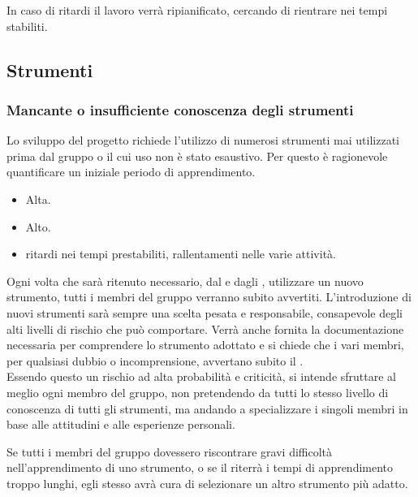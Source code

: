 \documentclass[a4paper, titlepage]{article}
\begin{document}
 In caso di ritardi il lavoro verrà ripianificato, cercando di rientrare nei tempi stabiliti.

\subsection{Strumenti}
\subsubsection{Mancante o insufficiente conoscenza degli strumenti}
 Lo sviluppo del progetto richiede l'utilizzo di numerosi strumenti mai utilizzati prima dal gruppo o il cui uso non è stato esaustivo. Per questo è ragionevole quantificare un iniziale periodo di apprendimento.

	\begin{itemize}
		\item {} Alta.
		\item {} Alto.
		\item {} ritardi nei tempi prestabiliti, rallentamenti nelle varie attività.
	\end{itemize}
	
 Ogni volta che sarà ritenuto necessario, dal  e dagli , utilizzare un nuovo strumento, tutti i membri del gruppo verranno subito avvertiti. L'introduzione di nuovi strumenti sarà sempre una scelta pesata e responsabile, consapevole degli alti livelli di rischio che può comportare. Verrà anche fornita la documentazione necessaria per comprendere lo strumento adottato e si chiede che i vari membri, per qualsiasi dubbio o incomprensione, avvertano subito il .\\
 Essendo questo un rischio ad alta probabilità e criticità, si intende sfruttare al meglio ogni membro del gruppo, non pretendendo da tutti lo stesso livello di conoscenza di tutti gli strumenti, ma andando a specializzare i singoli membri in base alle attitudini e alle esperienze personali.
	
 Se tutti i membri del gruppo dovessero riscontrare gravi difficoltà nell'apprendimento di uno strumento, o se il  riterrà i tempi di apprendimento troppo lunghi, egli stesso avrà cura di selezionare un altro strumento più adatto.
\end{document}
